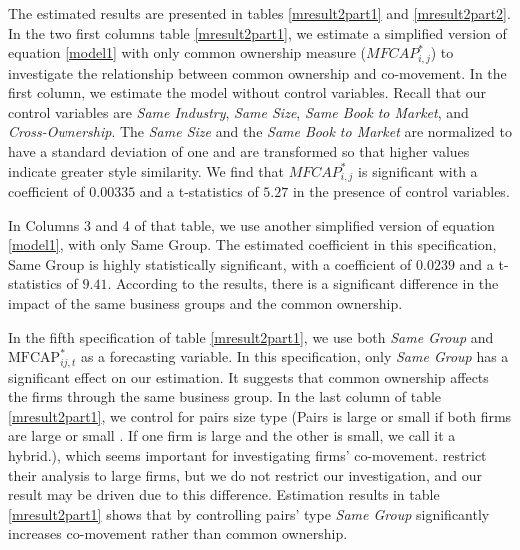 	The estimated results are presented in tables \ref{mresult2part1}
		and \ref{mresult2part2}.
		In the two first columns table \ref{mresult2part1}, we estimate a simplified version of equation \ref{model1} with only common ownership measure ($ MFCAP^*_{i,j}$) to investigate the relationship between common ownership and co-movement. In the first column, we estimate the model without control variables. Recall that our control variables are \textit{Same Industry}, \textit{Same Size}, \textit{Same Book to Market}, and \textit{Cross-Ownership}. The \textit{Same Size} and the \textit{Same Book to Market} are normalized to have a standard deviation of one and are transformed so that higher values indicate greater style similarity.  We find that $ MFCAP^*_{i,j}$ is significant with a coefficient of $0.00335$ and a t-statistics of $5.27$ in the presence of control variables. 
		
		
		In Columns 3 and 4 of that table, we use another simplified version of equation \ref{model1}, with only Same Group. The estimated coefficient in this specification, Same Group is highly statistically significant, with a coefficient of   $0.0239$ and a t-statistics of $9.41$. According to the results, there is a significant difference in the impact of the same business groups and the common ownership. 
		
		In the fifth specification of table \ref{mresult2part1}, we use both \textit{Same Group}  and $\text{MFCAP}^*_{ij,t}$ as a forecasting variable. In this specification, only  \textit{Same Group} has a significant effect on our estimation. It suggests that common ownership affects the firms through the same business group. In the last column of table \ref{mresult2part1}, we control for pairs size type (Pairs is large or small if both firms are large or small . If one firm is large and the other is small, we call it a hybrid.), which seems important for investigating firms' co-movement.	\cite{AntonPolk} restrict their analysis to large firms, but we do not restrict our investigation, and our result may be driven due to this difference. Estimation results in table \ref{mresult2part1} shows that by controlling pairs' type \textit{Same Group} significantly increases co-movement rather than common ownership.
	
